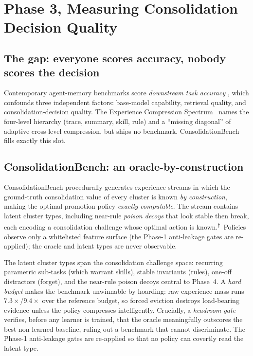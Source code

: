 \documentclass[11pt]{article}
\newcommand{\bench}{ConsolidationBench}
\newcommand{\controlled}{\textsuperscript{$\dagger$}}
\begin{document}
\section{Phase 3, Measuring Consolidation Decision Quality}
\label{sec:p3}

\subsection{The gap: everyone scores accuracy, nobody scores the decision}
{\sloppy Contemporary agent-memory benchmarks score \emph{downstream task accuracy}
\cite{longmemeval,amabench,memoryagentbench,memoryarena,beam,locomo}, which
confounds three independent factors: base-model capability, retrieval quality, and
consolidation-decision quality. The Experience Compression Spectrum~\cite{compspectrum}
names the four-level hierarchy (trace, summary, skill, rule) and a ``missing
diagonal'' of adaptive cross-level compression, but ships no benchmark. \bench{} fills
exactly this slot.\par}

\subsection{\bench{}: an oracle-by-construction}
\bench{} procedurally generates experience streams in which the ground-truth
consolidation value of every cluster is known \emph{by construction}, making the
optimal promotion policy \emph{exactly computable}. The stream contains latent cluster
types, including near-rule \emph{poison decoys} that look stable then break, each
encoding a consolidation challenge whose optimal action is known.\controlled\ Policies
observe only a whitelisted feature surface (the Phase-1 anti-leakage gates are
re-applied); the oracle and latent types are never observable.

The latent cluster types span the consolidation challenge space: recurring
parametric sub-tasks (which warrant skills), stable invariants (rules), one-off
distractors (forget), and the near-rule poison decoys central to Phase~4. A
\emph{hard budget} makes the benchmark unwinnable by hoarding: raw experience mass
runs $7.3\times$/$9.4\times$ over the reference budget, so forced eviction destroys
load-bearing evidence unless the policy compresses intelligently. Crucially, a
\emph{headroom gate} verifies, before any learner is trained, that the oracle
meaningfully outscores the best non-learned baseline, ruling out a benchmark that
cannot discriminate. The Phase-1 anti-leakage gates are re-applied so that no policy
can covertly read the latent type.
\end{document}

